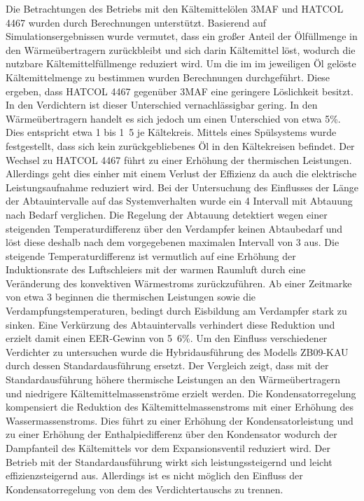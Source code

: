 Die Betrachtungen des Betriebs mit den Kältemittelölen 3MAF und HATCOL 4467 wurden durch  Berechnungen unterstützt. Basierend auf Simulationsergebnissen wurde vermutet, dass ein großer Anteil der Ölfüllmenge in den Wärmeübertragern zurückbleibt und sich darin Kältemittel löst, wodurch die nutzbare Kältemittelfüllmenge reduziert wird. Um die im im jeweiligen Öl gelöste Kältemittelmenge zu bestimmen wurden Berechnungen durchgeführt. Diese ergeben, dass HATCOL 4467 gegenüber 3MAF eine geringere Löslichkeit besitzt. In den Verdichtern ist dieser Unterschied vernachlässigbar gering. In den Wärmeübertragern handelt es sich jedoch um einen Unterschied von etwa \unit{5}{\%}. Dies entspricht etwa \unit{1}{\gram} bis \unit{1.5}{\gram} je Kältekreis. Mittels eines Spülsystems wurde festgestellt, dass sich kein zurückgebliebenes Öl in den Kältekreisen befindet. Der Wechsel zu HATCOL 4467 führt zu einer Erhöhung der thermischen Leistungen. Allerdings geht dies einher mit einem Verlust der Effizienz da auch die elektrische Leistungsaufnahme reduziert wird. \newline
Bei der Untersuchung des Einflusses der Länge der Abtauintervalle auf das Systemverhalten wurde ein \unit{4}{\hour} Intervall mit Abtauung nach Bedarf verglichen.
Die Regelung der Abtauung detektiert wegen einer steigenden Temperaturdifferenz über den Verdampfer keinen Abtaubedarf und löst diese deshalb nach dem vorgegebenen maximalen Intervall von \unit{3}{\hour} aus. Die steigende Temperaturdifferenz ist vermutlich auf eine Erhöhung der Induktionsrate des Luftschleiers mit der warmen Raumluft durch eine Veränderung des konvektiven Wärmestroms zurückzuführen. Ab einer Zeitmarke von etwa \unit{3}{\hour} beginnen die thermischen Leistungen sowie die Verdampfungstemperaturen, bedingt durch Eisbildung am Verdampfer stark zu sinken. Eine Verkürzung des Abtauintervalls verhindert diese Reduktion und erzielt damit einen EER-Gewinn von \unit{5.6}{\%}. \newline
Um den Einfluss verschiedener Verdichter zu untersuchen wurde die Hybridausführung des Modells ZB09-KAU durch dessen Standardausführung ersetzt. Der Vergleich zeigt, dass mit der Standardausführung höhere thermische Leistungen an den Wärmeübertragern und niedrigere Kältemittelmassenströme erzielt werden. Die Kondensatorregelung kompensiert die Reduktion des Kältemittelmassenstroms mit einer Erhöhung des Wassermassenstroms. Dies führt zu einer Erhöhung der Kondensatorleistung und zu einer Erhöhung der Enthalpiedifferenz über den Kondensator wodurch der Dampfanteil des Kältemittels vor dem Expansionsventil reduziert wird. Der Betrieb mit der Standardausführung wirkt sich leistungssteigernd und leicht effizienzsteigernd aus. Allerdings ist es nicht möglich den Einfluss der Kondensatorregelung von dem des Verdichtertauschs zu trennen.  \newline



